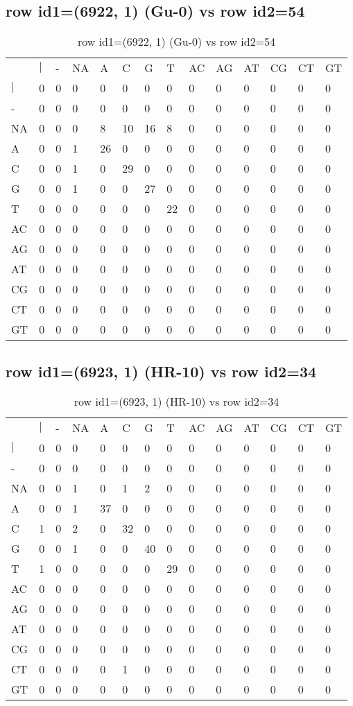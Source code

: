 \subsection{row id1=(6922, 1) (Gu-0) vs row id2=54}
\begin{center}
\begin{longtable}{|l|l|l|l|l|l|l|l|l|l|l|l|l|l|}
\caption{row id1=(6922, 1) (Gu-0) vs row id2=54} \label{table_dm110}\\
\hline
\\
\hline
&$|$&-&NA&A&C&G&T&AC&AG&AT&CG&CT&GT\\
$|$&0&0&0&0&0&0&0&0&0&0&0&0&0\\
-&0&0&0&0&0&0&0&0&0&0&0&0&0\\
NA&0&0&0&8&10&16&8&0&0&0&0&0&0\\
A&0&0&1&26&0&0&0&0&0&0&0&0&0\\
C&0&0&1&0&29&0&0&0&0&0&0&0&0\\
G&0&0&1&0&0&27&0&0&0&0&0&0&0\\
T&0&0&0&0&0&0&22&0&0&0&0&0&0\\
AC&0&0&0&0&0&0&0&0&0&0&0&0&0\\
AG&0&0&0&0&0&0&0&0&0&0&0&0&0\\
AT&0&0&0&0&0&0&0&0&0&0&0&0&0\\
CG&0&0&0&0&0&0&0&0&0&0&0&0&0\\
CT&0&0&0&0&0&0&0&0&0&0&0&0&0\\
GT&0&0&0&0&0&0&0&0&0&0&0&0&0\\
\hline
\end{longtable}
\end{center}

\subsection{row id1=(6923, 1) (HR-10) vs row id2=34}
\begin{center}
\begin{longtable}{|l|l|l|l|l|l|l|l|l|l|l|l|l|l|}
\caption{row id1=(6923, 1) (HR-10) vs row id2=34} \label{table_dm112}\\
\hline
\\
\hline
&$|$&-&NA&A&C&G&T&AC&AG&AT&CG&CT&GT\\
$|$&0&0&0&0&0&0&0&0&0&0&0&0&0\\
-&0&0&0&0&0&0&0&0&0&0&0&0&0\\
NA&0&0&1&0&1&2&0&0&0&0&0&0&0\\
A&0&0&1&37&0&0&0&0&0&0&0&0&0\\
C&1&0&2&0&32&0&0&0&0&0&0&0&0\\
G&0&0&1&0&0&40&0&0&0&0&0&0&0\\
T&1&0&0&0&0&0&29&0&0&0&0&0&0\\
AC&0&0&0&0&0&0&0&0&0&0&0&0&0\\
AG&0&0&0&0&0&0&0&0&0&0&0&0&0\\
AT&0&0&0&0&0&0&0&0&0&0&0&0&0\\
CG&0&0&0&0&0&0&0&0&0&0&0&0&0\\
CT&0&0&0&0&1&0&0&0&0&0&0&0&0\\
GT&0&0&0&0&0&0&0&0&0&0&0&0&0\\
\hline
\end{longtable}
\end{center}

